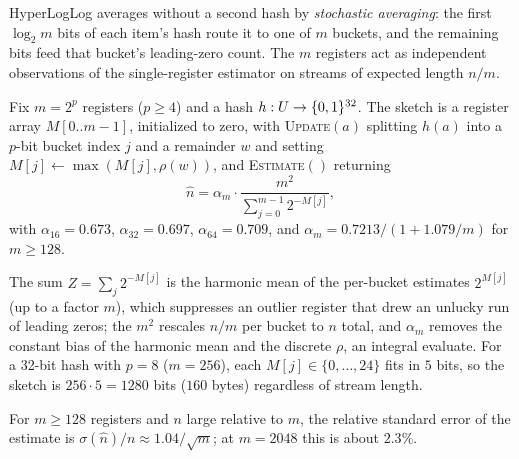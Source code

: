 HyperLogLog averages without a second hash by \emph{stochastic averaging}: the
first $\log_2 m$ bits of each item's hash route it to one of $m$ buckets, and
the remaining bits feed that bucket's leading-zero count. The $m$ registers act
as independent observations of the single-register estimator on streams of
expected length $n/m$.

\begin{definition}
\label{def:hyperloglog}
Fix $m = 2^p$ registers ($p \ge 4$) and a hash $h : U \to \{0,1\}^{32}$.
The sketch is a register array $M[0..m-1]$, initialized to zero, with
\textsc{Update}$(a)$ splitting $h(a)$ into a $p$-bit bucket index $j$ and a
remainder $w$ and setting $M[j] \gets \max(M[j], \rho(w))$, and
\textsc{Estimate}$()$ returning
\[
  \hat n = \alpha_m \cdot \frac{m^2}{\sum_{j=0}^{m-1} 2^{-M[j]}},
\]
with $\alpha_{16} = 0.673$, $\alpha_{32} = 0.697$, $\alpha_{64} = 0.709$, and
$\alpha_m = 0.7213/(1 + 1.079/m)$ for $m \ge 128$.
\end{definition}

\begin{algorithm}[ht]
  \caption{HyperLogLog update and estimate}
  \label{alg:hyperloglog-update-estimate}
  \BlankLine
\end{algorithm}

The sum $Z = \sum_j 2^{-M[j]}$ is the harmonic mean of the per-bucket estimates
$2^{M[j]}$ (up to a factor $m$), which suppresses an outlier register that drew
an unlucky run of leading zeros; the $m^2$ rescales $n/m$ per bucket to $n$
total, and $\alpha_m$ removes the constant bias of the harmonic mean and the
discrete $\rho$, an integral \textcite{flajolet-et-al-2007} evaluate. For a
32-bit hash with $p = 8$ ($m = 256$), each $M[j] \in \{0, \ldots, 24\}$ fits in
$5$ bits, so the sketch is $256 \cdot 5 = 1280$ bits ($160$ bytes) regardless of
stream length.

\begin{proposition}
\label{prop:hyperloglog-error}
For $m \ge 128$ registers and $n$ large relative to $m$, the relative standard
error of the estimate is $\sigma(\hat n)/n \approx 1.04/\sqrt{m}$; at $m = 2048$
this is about $2.3\%$.
\end{proposition}

